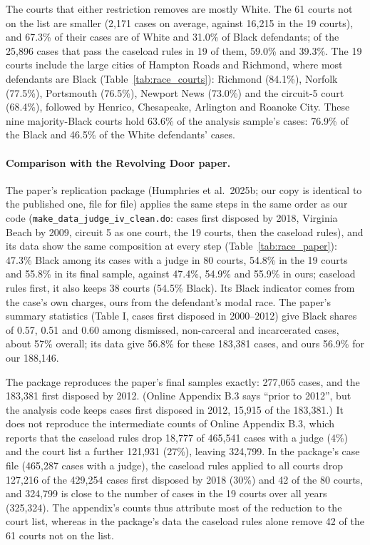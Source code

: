 \documentclass[11pt]{article}
\begin{document}
The courts that either restriction removes are mostly White. The 61 courts not on the list are smaller (2,171 cases on average, against 16,215 in the 19 courts), and 67.3\% of their cases are of White and 31.0\% of Black defendants; of the 25,896 cases that pass the caseload rules in 19 of them, 59.0\% and 39.3\%. The 19 courts include the large cities of Hampton Roads and Richmond, where most defendants are Black (Table~\ref{tab:race_courts}): Richmond (84.1\%), Norfolk (77.5\%), Portsmouth (76.5\%), Newport News (73.0\%) and the circuit-5 court (68.4\%), followed by Henrico, Chesapeake, Arlington and Roanoke City. These nine majority-Black courts hold 63.6\% of the analysis sample's cases: 76.9\% of the Black and 46.5\% of the White defendants' cases.

\paragraph{Comparison with the Revolving Door paper.} The paper's replication package (Humphries et al.\ 2025b; our copy is identical to the published one, file for file) applies the same steps in the same order as our code (\texttt{make\_data\_\allowbreak judge\_\allowbreak iv\_\allowbreak clean.do}: cases first disposed by 2018, Virginia Beach by 2009, circuit 5 as one court, the 19 courts, then the caseload rules), and its data show the same composition at every step (Table~\ref{tab:race_paper}): 47.3\% Black among its cases with a judge in 80 courts, 54.8\% in the 19 courts and 55.8\% in its final sample, against 47.4\%, 54.9\% and 55.9\% in ours; caseload rules first, it also keeps 38 courts (54.5\% Black). Its Black indicator comes from the case's own charges, ours from the defendant's modal race. The paper's summary statistics (Table I, cases first disposed in 2000--2012) give Black shares of 0.57, 0.51 and 0.60 among dismissed, non-carceral and incarcerated cases, about 57\% overall; its data give 56.8\% for these 183,381 cases, and ours 56.9\% for our 188,146.

The package reproduces the paper's final samples exactly: 277,065 cases, and the 183,381 first disposed by 2012. (Online Appendix B.3 says ``prior to 2012'', but the analysis code keeps cases first disposed in 2012, 15,915 of the 183,381.) It does not reproduce the intermediate counts of Online Appendix B.3, which reports that the caseload rules drop 18,777 of 465,541 cases with a judge (4\%) and the court list a further 121,931 (27\%), leaving 324,799. In the package's case file (465,287 cases with a judge), the caseload rules applied to all courts drop 127,216 of the 429,254 cases first disposed by 2018 (30\%) and 42 of the 80 courts, and 324,799 is close to the number of cases in the 19 courts over all years (325,324). The appendix's counts thus attribute most of the reduction to the court list, whereas in the package's data the caseload rules alone remove 42 of the 61 courts not on the list.
\end{document}
